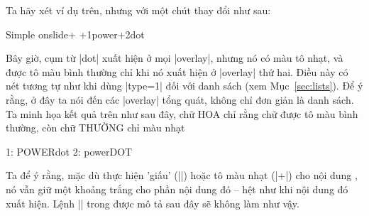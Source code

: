 \DescribeMacro{\onslide+}
Ta hãy xét ví dụ trên, nhưng với một chút thay đổi như sau:
\begin{example}
 \begin{slide}{Simple onslide+}
   \onslide+{1}{power}\onslide+{2}{dot}
 \end{slide}
\end{example}
Bây giờ, cụm từ |dot| xuất hiện ở mọi |overlay|, nhưng nó
có màu tô nhạt, và được tô màu bình thường
chỉ khi nó xuất hiện ở |overlay| thứ hai. Điều này có nét tương
tự như khi dùng |type=1| đối với danh sách (xem Mục~\vref{sec:lists}).
Để ý rằng, ở đây ta nói đến các |overlay| tổng quát, không chỉ đơn
giản là danh sách. Ta minh họa kết quả trên như sau đây, chữ HOA
chỉ rằng chữ được tô màu bình thường, còn chữ THƯỜNG chỉ màu nhạt
\begin{example}
  1: POWERdot
  2: powerDOT
\end{example}
Ta để ý rằng, mặc dù thực hiện 'giấu' (|\oneslide|)
hoặc tô màu nhạt (|\oneslide+|) cho nội dung , nó vẫn giữ một khoảng
trắng cho phần nội dung đó -- hệt như khi nội dung đó xuất hiện.
Lệnh |\onslide*| trong được mô tả sau đây sẽ không làm như vậy.

